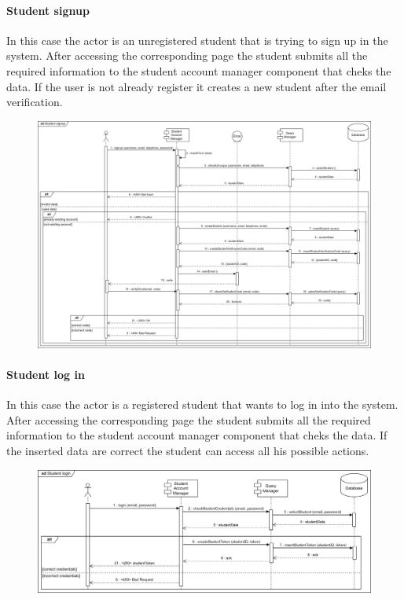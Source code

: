 \documentclass[12pt, a4paper]{report}
\begin{document}
    \paragraph*{Student signup}
    In this case the actor is an unregistered student that is trying to sign up in the system.
    After accessing the corresponding page the student submits all the required information to the student account manager component that cheks the data. 
    If the user is not already register it creates a new student after the email verification. 
    \begin{figure}[H]
        \centering
        \includegraphics[width=1.0\linewidth]{images/ssrv.png}
    \end{figure}

    \paragraph*{Student log in}
    In this case the actor is a registered student that wants to log in into the system. 
    After accessing the corresponding page the student submits all the required information to the student account manager component that cheks the data. 
    If the inserted data are correct the student can access all his possible actions. 
    \begin{figure}[H]
        \centering
        \includegraphics[width=1.0\linewidth]{images/slrv.png}
    \end{figure}
\end{document}
